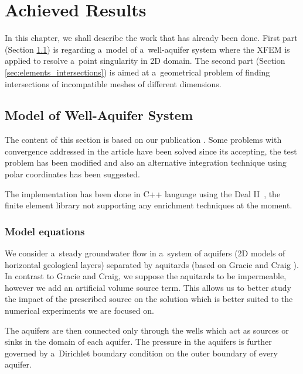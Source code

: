 \documentclass[dvipsnames,FM,Dis]{tulthesis}
\begin{document}

\chapter{Achieved Results} \label{chap:results}


In this chapter, we shall describe the work that has already been done. First part (Section \ref{sec:model_aquifer}) 
is regarding a~model of a~well-aquifer system where the XFEM is applied to resolve a~point singularity in 2D domain. 
The second part (Section \ref{sec:elements_intersections}) is aimed at a~geometrical problem of finding 
intersections of incompatible meshes of different dimensions.

\section{Model of Well-Aquifer System} 
\label{sec:model_aquifer}
The content of this section is based on our publication \cite{exner_2016}. Some problems with convergence addressed in the article
have been solved since its accepting, the test problem has been modified and also an alternative integration technique
using polar coordinates has been suggested.

The implementation has been done in C++ language using the Deal II~\cite{bangerth_deal.ii_2007}, 
the finite element library not supporting any enrichment techniques at the moment.

\subsection{Model equations}
We consider a~steady groundwater flow in a~system of aquifers (2D models of horizontal geological layers) separated by aquitards
(based on Gracie and Craig \cite{gracie_modelling_2010,craig_using_2011}).
In contrast to Gracie and Craig, we suppose the aquitards to be impermeable, 
however we add an artificial volume source term. This allows us to better study the impact of 
the prescribed source on the solution which is better suited to the numerical experiments we are focused on. 

The aquifers are then connected only through the wells 
which act as sources or sinks in the domain of each aquifer. The pressure in the aquifers is further governed 
by a~Dirichlet boundary condition on the outer boundary of every aquifer.
\end{document}

